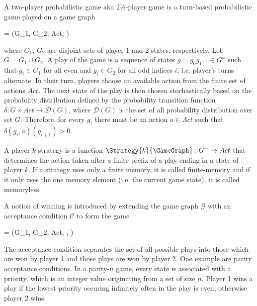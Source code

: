\stopsubsection


\startsubsection[title={2-Player Probabilistic Games}]

    A two-player probabilistic game aka 2½-player game is a turn-based probabilistic game played on a game graph

    \startformula
         = (G_1, G_2, Act, \delta) \EndComma
    \stopformula

    where $G_1$, $G_2$ are disjoint sets of player 1 and 2 states, respectively.
    Let $G = G_1 \cup G_2$.
    A play of the game is a sequence of states $g = g_0 g_1 ... \in G^\omega$ such that $g_i \in G_1$ for all even and $g_i \in G_2$ for all odd indices $i$, i.e. player's turns alternate.
    In their turn, players choose an available action from the finite set of actions $Act$.
    The next state of the play is then chosen stochastically based on the probability distribution defined by the probability transition function $\delta: G \times Act \rightarrow \mathcal{D}(G)$, where $\mathcal{D}(G)$ is the set of all probability distribution over set $G$.
    Therefore, for every $g_i$ there must be an action $a \in Act$ such that $\delta(g_i, a)(g_{i+1}) \gt 0$.

    A player $k$ strategy is a function $\Strategy{k}{\GameGraph}: G^+ \rightarrow Act$ that determines the action taken after a finite prefix of a play ending in a state of player $k$.
    If a strategy uses only a finite memory, it is called finite-memory and if it only uses the one memory element (i.e. the current game state), it is called memoryless.

\stopsubsection


\startsubsection[title={Winning and Solving 2-Player Probabilistic Games}]

    A notion of winning is introduced by extending the game graph $\mathcal{G}$ with an acceptance condition $\mathcal{C}$ to form the game

    \startformula
         = (G_1, G_2, Act, \delta, ) \EndPeriod
    \stopformula

    The acceptance condition separates the set of all possible plays into those which are won by player 1 and those plays are won by player 2.
    One example are parity acceptance conditions.
    In a parity-$n$ game, every state is associated with a priority, which is an integer value originating from a set of size $n$.
    Player 1 wins a play if the lowest priority occuring infinitely often in the play is even, otherwise player 2 wins.

